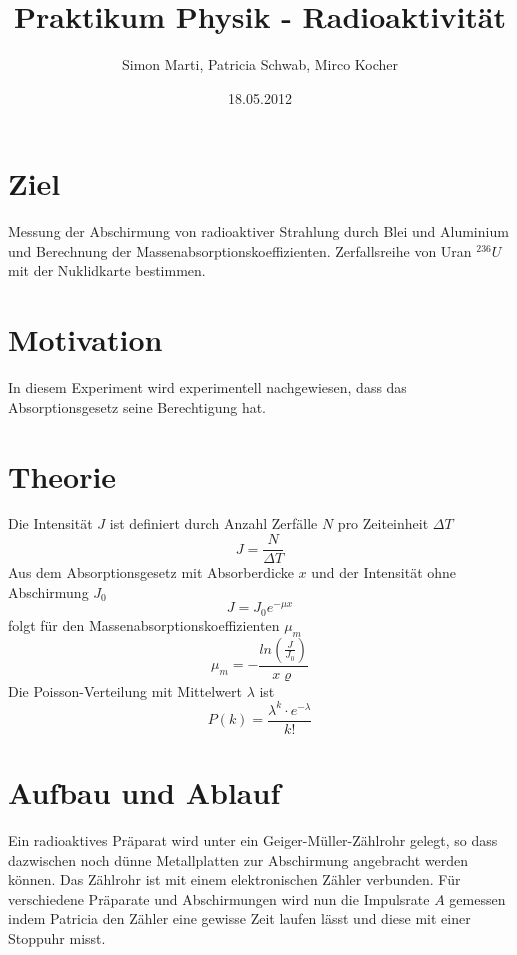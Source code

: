 \documentclass[12pt,a4paper]{article}
\title{Praktikum Physik - Radioaktivität}
\author{Simon Marti, Patricia Schwab, Mirco Kocher}
\date{18.05.2012}
\begin{document}
\maketitle

\section*{Ziel}
Messung der Abschirmung von radioaktiver Strahlung durch Blei und Aluminium und Berechnung der Massenabsorptionskoeffizienten. Zerfallsreihe von Uran $^{236}U$ mit der Nuklidkarte bestimmen.

\section*{Motivation}
In diesem Experiment wird experimentell nachgewiesen, dass das Absorptionsgesetz seine Berechtigung hat.

\section*{Theorie}
Die Intensit\"at $J$ ist definiert durch Anzahl Zerf\"alle $N$ pro Zeiteinheit $\Delta T$
\begin{equation}
J =\frac{N}{\Delta T}
\end{equation}
Aus dem Absorptionsgesetz mit Absorberdicke $x$ und der Intensit\"at ohne Abschirmung $J_0$
\begin{equation}
J = J_0 e^{-\mu x}
\end{equation}
folgt f\"ur den Massenabsorptionskoeffizienten $\mu_m$
\begin{equation}
\mu_m = - \frac{ln(\frac{J}{J_0})}{x \varrho}
\end{equation}
Die Poisson-Verteilung mit Mittelwert $\lambda$ ist
\begin{equation}
P(k) = \frac{\lambda^k \cdot e^{-\lambda}}{k!}
\end{equation}


\section*{Aufbau und Ablauf}
Ein radioaktives Präparat wird unter ein Geiger-Müller-Zählrohr gelegt, so dass dazwischen noch dünne Metallplatten zur Abschirmung angebracht werden können. Das Zählrohr ist mit einem elektronischen Zähler verbunden. Für verschiedene Präparate und Abschirmungen wird nun die Impulsrate $A$ gemessen indem Patricia den Zähler eine gewisse Zeit laufen lässt und diese mit einer Stoppuhr misst.
\end{document}
